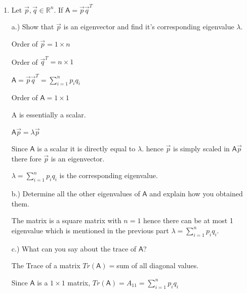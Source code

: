 \documentclass[answers, a4paper, 11pt]{exam}
\newcommand{\mat}[1]{\boldsymbol { \mathsf{#1}} }
\begin{document}
\begin{enumerate}
\begin{enumerate}
\begin{solution}
    \end{solution}
	
\end{enumerate}        

\item Let $ \Vec{p}, \Vec{q} \in \mathbb R^{n}$. If $ \mat{A} = \Vec{p} \Vec{q}^{T}$


a.) Show that $\Vec{p}$ is an eigenvector and find it's corresponding eigenvalue $\lambda$. 

\begin{solution}
    Order of $\vec p = 1 \times n$

Order of $\vec q^T = n \times 1$

$\mat A = \vec p \vec q^T = \sum_{i=1}^n p_i q_i$

Order of $\mat A = 1 \times 1 $

A is essentially a scalar. 

$\mat A \vec p = \lambda \vec p$

Since $\mat A$ is a scalar it is directly equal to $\lambda.$ hence $\vec p$ is simply scaled in $\mat A \vec p$ there fore $\vec p$ is an eigenvector. 

$\lambda = \sum_{i=1}^n p_i q_i$ is the corresponding eigenvalue.

\end{solution}

 

b.) Determine all the other eigenvalues of $\mat{A}$ and explain how you obtained them.

\begin{solution}
    The matrix is a square matrix with $n = 1$ hence there can be at most 1 eigenvalue which is mentioned in the previous part $\lambda = \sum_{i=1}^n p_i q_i$.

\end{solution} 



c.) What can you say about the trace of $\mat{A}$?

\begin{solution}
    The Trace of a matrix $Tr(\mat A) =$sum of all diagonal values. 

Since $\mat A$ is a $1 \times 1$ matrix, $Tr(\mat A) = A_{11} = \sum_{i=1}^n p_i q_i$

\end{solution}




\end{enumerate}
\end{document}
